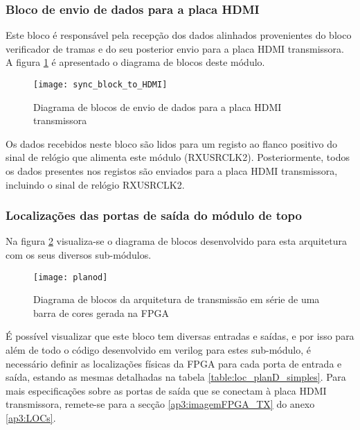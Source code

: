\subsubsection*{Bloco de envio de dados para a placa HDMI} \label{subsub:serial_send signals to HDMI}

Este bloco é responsável pela recepção dos dados alinhados provenientes do bloco verificador de tramas e do seu posterior envio para a placa HDMI transmissora. A figura \ref{fig:sync_block_to_HDMI} é apresentado o diagrama de blocos deste módulo.

\begin{figure}[h!]
	\begin{center}
		\leavevmode
		\texttt{[image: sync\_block\_to\_HDMI]}
		\captionsetup{width=1.0\linewidth}
		\caption[Diagrama de blocos de envio de dados para a placa HDMI transmissora]{Diagrama de blocos de envio de dados para a placa HDMI transmissora}
		\label{fig:sync_block_to_HDMI}
	\end{center}
\end{figure}

Os dados recebidos neste bloco são lidos para um registo ao flanco positivo do sinal de relógio que alimenta este módulo (RXUSRCLK2). Posteriormente, todos os dados presentes nos registos são enviados para a placa HDMI transmissora, incluindo o sinal de relógio RXUSRCLK2.

\subsubsection*{Localizações das portas de saída do módulo de topo} \label{subsub:serial_locs_planD}

Na figura \ref{fig:planD} visualiza-se o diagrama de blocos desenvolvido para esta arquitetura com os seus diversos sub-módulos. 
\begin{figure}[h!]
	\begin{center}
		\leavevmode
		\texttt{[image: planod]}
		\captionsetup{width=1.0\linewidth}
		\caption[Diagrama de blocos da arquitetura de transmissão em série de uma barra de cores gerada na FPGA]{Diagrama de blocos da arquitetura de transmissão em série de uma barra de cores gerada na FPGA}
		\label{fig:planD}
	\end{center}
\end{figure}

É possível visualizar que este bloco tem diversas entradas e saídas, e por isso para além de todo o código desenvolvido em verilog para estes sub-módulo, é necessário definir as localizações físicas da FPGA para cada porta de entrada e saída, estando as mesmas detalhadas na  tabela \ref{table:loc_planD_simples}. Para mais especificações sobre as portas de saída que se conectam à placa HDMI transmissora, remete-se para a secção \ref{ap3:imagemFPGA_TX} do anexo \ref{ap3:LOCs}.

